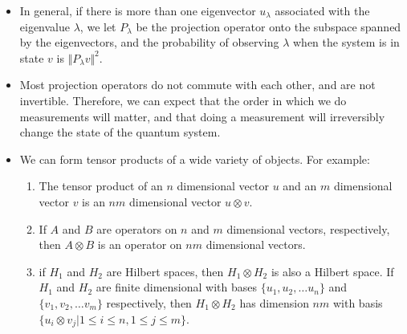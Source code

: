 \documentclass{article}
\def\pagedone{\newpage}
\def\hilbert{\mathit{H}}
\def\tensor{\otimes}
\begin{document}
		
\pagedone

\begin{itemize}
	\item In general, if there is more than one eigenvector $u_\lambda$ associated with the
		eigenvalue $\lambda$, we let $P_\lambda$ be the projection operator onto the subspace
		spanned by the eigenvectors, and the probability of observing $\lambda$ when the
		system is in state $v$ is $\Vert P_\lambda v\Vert ^ 2 $.
		
	\item Most projection operators do not commute with each other, and are not invertible.
	  	Therefore, we can expect that the order in which we do measurements will matter, and that
	   	doing a measurement will irreversibly change the state of the quantum system.

\end{itemize}



\pagedone
{}
\begin{itemize}
	\item We can form tensor products of a wide variety of objects.  For example: 
	\begin{enumerate}
		\item The tensor product of an $n$ dimensional vector $u$ and an $m$ dimensional vector $v$ is an $nm$ dimensional vector $u \tensor v$.
		\item If $A$ and $B$ are operators on $n$ and $m$ dimensional vectors, respectively, then $A \tensor B$ is an operator on $nm$ dimensional vectors.
		\item if $\hilbert_1$ and $\hilbert_2$ are Hilbert spaces, then $\hilbert_1 \tensor \hilbert_2$ is also a Hilbert space.  If $\hilbert_1$ and $\hilbert_2$ are finite dimensional with bases $\{u_1, u_2, \ldots u_n\}$ and $\{v_1, v_2, \ldots v_m\}$ respectively, then $\hilbert_1 \tensor \hilbert_2$ has dimension $nm$ with basis $\{u_i \tensor v_j | 1 \le i \le n, 1 \le j \le m\}$.
\end{enumerate}
\end{itemize}
\end{document}
